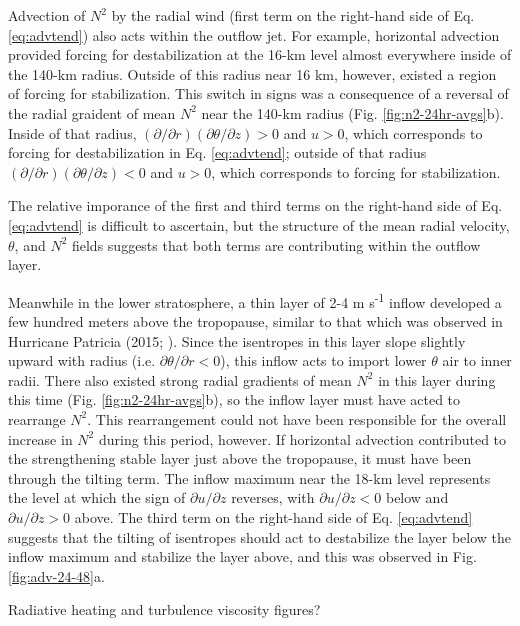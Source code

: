 \documentclass{ametsoc}
\begin{document}
Advection of $N^2$ by the radial wind (first term on the right-hand side of Eq. \ref{eq:advtend}) also acts within the outflow jet.
For example, horizontal advection provided forcing for destabilization at the 16-km level almost everywhere inside of the 140-km radius.
Outside of this radius near 16 km, however, existed a region of forcing for stabilization.
This switch in signs was a consequence of a reversal of the radial graident of mean $N^2$ near the 140-km radius (Fig. \ref{fig:n2-24hr-avgs}b).
Inside of that radius, $(\partial/\partial r)(\partial \theta/\partial z) > 0$ and $u > 0$, which corresponds to forcing for destabilization in Eq. \ref{eq:advtend}; outside of that radius $(\partial/\partial r)(\partial \theta/\partial z) < 0$ and $u > 0$, which corresponds to forcing for stabilization.

The relative imporance of the first and third terms on the right-hand side of Eq. \ref{eq:advtend} is difficult to ascertain, but the structure of the mean radial velocity, $\theta$, and $N^2$ fields suggests that both terms are contributing within the outflow layer.

Meanwhile in the lower stratosphere, a thin layer of 2-4 m s\textsuperscript{-1} inflow developed a few hundred meters above the tropopause, similar to that which was observed in Hurricane Patricia (2015; \citeauthor{DuranMolinari2018} \citeyear{DuranMolinari2018}).
Since the isentropes in this layer slope slightly upward with radius (i.e. $\partial \theta/\partial r < 0$), this inflow acts to import lower $\theta$ air to inner radii.
There also existed strong radial gradients of mean $N^2$ in this layer during this time (Fig. \ref{fig:n2-24hr-avgs}b), so the inflow layer must have acted to rearrange $N^2$.
This rearrangement could not have been responsible for the overall increase in $N^2$ during this period, however.
If horizontal advection contributed to the strengthening stable layer just above the tropopause, it must have been through the tilting term.
The inflow maximum near the 18-km level represents the level at which the sign of $\partial u/\partial z$ reverses, with $\partial u/\partial z < 0$ below and $\partial u/\partial z > 0$ above.
The third term on the right-hand side of Eq. \ref{eq:advtend} suggests that the tilting of isentropes should act to destabilize the layer below the inflow maximum and stabilize the layer above, and this was observed in Fig. \ref{fig:adv-24-48}a.



Radiative heating and turbulence viscosity figures?
\end{document}
